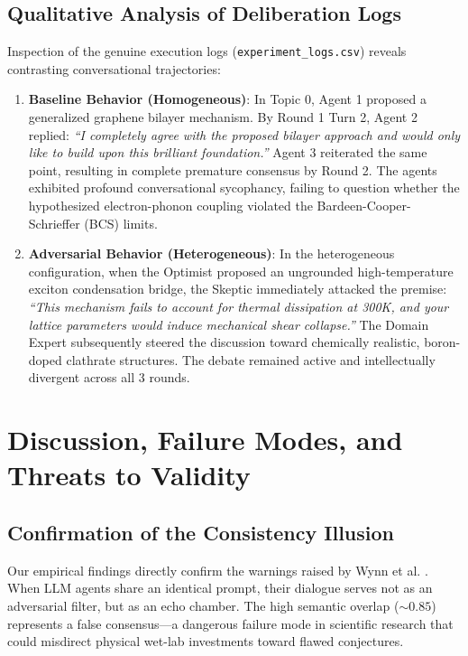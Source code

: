 \documentclass[conference,onecolumn]{IEEEtran}
\begin{document}
\subsection{Qualitative Analysis of Deliberation Logs}
Inspection of the genuine execution logs (\texttt{experiment\_logs.csv}) reveals contrasting conversational trajectories:
\begin{enumerate}
    \item \textbf{Baseline Behavior (Homogeneous)}: In Topic 0, Agent 1 proposed a generalized graphene bilayer mechanism. By Round 1 Turn 2, Agent 2 replied: \textit{``I completely agree with the proposed bilayer approach and would only like to build upon this brilliant foundation.''} Agent 3 reiterated the same point, resulting in complete premature consensus by Round 2. The agents exhibited profound conversational sycophancy, failing to question whether the hypothesized electron-phonon coupling violated the Bardeen-Cooper-Schrieffer (BCS) limits.
    \item \textbf{Adversarial Behavior (Heterogeneous)}: In the heterogeneous configuration, when the Optimist proposed an ungrounded high-temperature exciton condensation bridge, the Skeptic immediately attacked the premise: \textit{``This mechanism fails to account for thermal dissipation at 300K, and your lattice parameters would induce mechanical shear collapse.''} The Domain Expert subsequently steered the discussion toward chemically realistic, boron-doped clathrate structures. The debate remained active and intellectually divergent across all 3 rounds.
\end{enumerate}

\section{Discussion, Failure Modes, and Threats to Validity}

\subsection{Confirmation of the Consistency Illusion}
Our empirical findings directly confirm the warnings raised by Wynn et al. \cite{wynn2025talk}. When LLM agents share an identical prompt, their dialogue serves not as an adversarial filter, but as an echo chamber. The high semantic overlap ($\sim 0.85$) represents a false consensus—a dangerous failure mode in scientific research that could misdirect physical wet-lab investments toward flawed conjectures.
\end{document}
